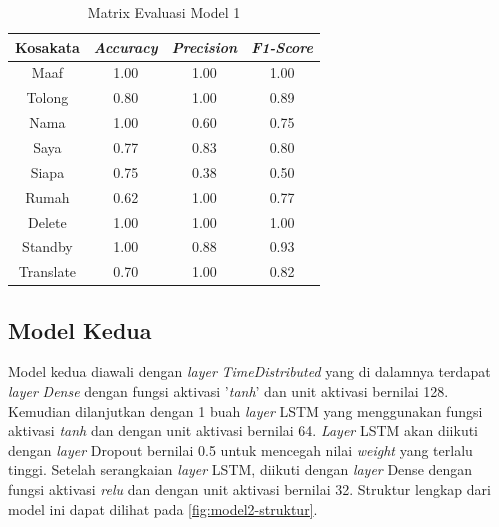 \begin{longtable}{|c|c|c|c|}
  \caption{Matrix Evaluasi Model 1}
  \label{tb:model1stat}                                   \\
  \hline
  \rowcolor[HTML]{C0C0C0}
  \textbf{Kosakata} & \textbf{\emph{Accuracy}} & \textbf{\emph{Precision}} & \textbf{\emph{F1-Score}} \\
  \hline
  Maaf              & 1.00                        & 1.00                   & 1.00                \\
  Tolong            & 0.80                        & 1.00                   & 0.89                \\
  Nama              & 1.00                        & 0.60                   & 0.75                \\
  Saya              & 0.77                        & 0.83                   & 0.80                \\
  Siapa             & 0.75                        & 0.38                   & 0.50                \\
  Rumah             & 0.62                        & 1.00                   & 0.77                \\
  Delete            & 1.00                        & 1.00                   & 1.00                \\
  Standby           & 1.00                        & 0.88                   & 0.93                \\
  Translate         & 0.70                        & 1.00                   & 0.82                \\
  \hline
\end{longtable}

\subsection{Model Kedua}
\label{sec:analisismodel2}

Model kedua diawali dengan \emph{layer} \textit{TimeDistributed} yang di dalamnya terdapat \emph{layer} \textit{Dense} dengan fungsi aktivasi '\textit{tanh}' dan unit aktivasi bernilai 128. Kemudian dilanjutkan dengan 1 buah \emph{layer} LSTM yang menggunakan fungsi aktivasi \emph{tanh} dan dengan unit aktivasi bernilai 64. \emph{Layer} LSTM akan diikuti dengan \emph{layer} Dropout bernilai 0.5 untuk mencegah nilai \emph{weight} yang terlalu tinggi. Setelah serangkaian \emph{layer} LSTM, diikuti dengan \emph{layer} Dense dengan fungsi aktivasi \emph{relu} dan dengan unit aktivasi bernilai 32. Struktur lengkap dari model ini dapat dilihat pada \ref{fig:model2-struktur}.

